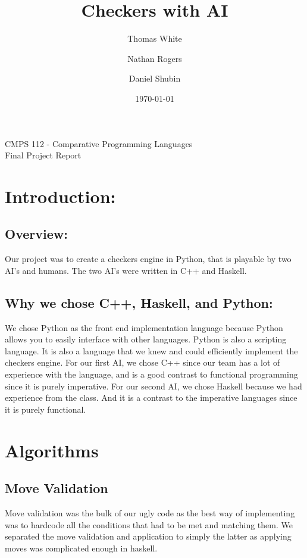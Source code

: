 \documentclass[12pt]{article}
\begin{document}
\begin{titlepage}
\title{\huge \bf Checkers with AI}
\date{\today}
\author{Thomas White \\
    \and Nathan Rogers \\
    \and Daniel Shubin}
\maketitle
\begin{center}
    CMPS 112 - Comparative Programming Languages \\
    Final Project Report
\end{center}
\end{titlepage}

\section{Introduction:}
    \subsection{Overview:}
        Our project was to create a checkers engine in Python,
        that is playable by two AI's and humans. The two AI's
        were written in C++ and Haskell.
    \subsection{Why we chose C++, Haskell, and Python:}
        We chose Python as the front end implementation language
        because Python allows you to easily interface with other
        languages. Python is also a scripting language.
        It is also a language that we knew and could efficiently
        implement the checkers engine.
        For our first AI, we chose C++ since our team has a lot of
        experience with the language, and is a good contrast to functional
        programming since it is purely imperative.
        For our second AI, we chose Haskell because we had experience from
        the class. And it is a contrast to the imperative languages since
        it is purely functional.

\section{Algorithms}
		
	\subsection{Move Validation}
	Move validation was the bulk of our ugly code as the best way of implementing was to hardcode all the conditions that had to be met and matching them. We separated the move validation and application to simply the latter as applying moves was complicated enough in haskell.
	
\end{document}
